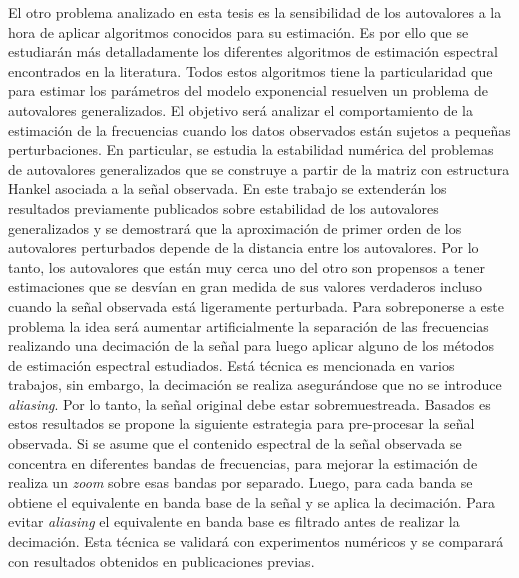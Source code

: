 El otro problema analizado en esta tesis es la sensibilidad de los autovalores a la hora de aplicar algoritmos conocidos para su estimación. Es por ello que se estudiarán más detalladamente los diferentes algoritmos de estimación espectral encontrados en la literatura. Todos estos algoritmos tiene la particularidad que para estimar los parámetros del modelo exponencial resuelven un problema de autovalores generalizados. El objetivo será analizar el comportamiento de la estimación de la frecuencias cuando los datos observados están sujetos a pequeñas perturbaciones. En particular, se estudia la estabilidad  numérica del problemas de autovalores generalizados que se construye a partir de la matriz con estructura Hankel asociada a la señal observada. En este trabajo se extenderán los resultados previamente publicados sobre estabilidad  de los autovalores generalizados y se demostrará que  la aproximación de primer orden de los autovalores perturbados depende de la distancia entre los autovalores. Por lo tanto, los autovalores que están muy cerca uno del otro son propensos a tener estimaciones que se desvían en gran medida de sus valores verdaderos incluso cuando la señal observada está ligeramente perturbada. Para sobreponerse a este problema la idea será aumentar artificialmente la separación de las frecuencias realizando una decimación de la señal para luego aplicar alguno de los métodos de estimación espectral estudiados. Está técnica es mencionada en varios trabajos, sin embargo, la decimación se realiza asegurándose que no se introduce \emph{aliasing}. Por lo tanto, la señal original debe estar sobremuestreada. Basados es estos resultados se propone la siguiente estrategia para pre-procesar la señal observada. Si se asume que el contenido espectral de la señal observada se concentra en diferentes bandas de frecuencias, para mejorar la estimación de realiza un \emph{zoom} sobre esas bandas por separado. Luego, para cada banda se obtiene el equivalente en banda base de la señal y se aplica la decimación. Para evitar \emph{aliasing} el equivalente en banda base es filtrado antes de realizar la decimación. Esta técnica se validará con experimentos numéricos y se comparará con resultados obtenidos en publicaciones previas. %

